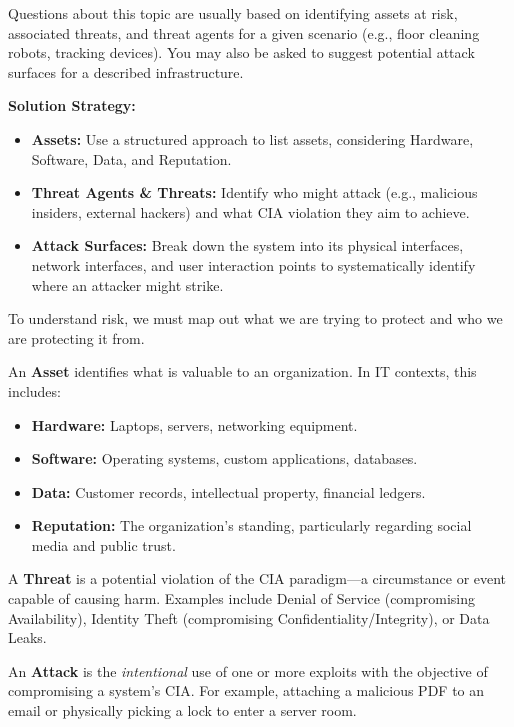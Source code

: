 \begin{tcolorbox}[colback=blue!5!white,colframe=blue!75!black,title=Exam Insight]
Questions about this topic are usually based on identifying assets at risk, associated threats, and threat agents for a given scenario (e.g., floor cleaning robots, tracking devices). You may also be asked to suggest potential attack surfaces for a described infrastructure.

\textbf{Solution Strategy:}
\begin{itemize}
    \item \textbf{Assets:} Use a structured approach to list assets, considering Hardware, Software, Data, and Reputation.
    \item \textbf{Threat Agents \& Threats:} Identify who might attack (e.g., malicious insiders, external hackers) and what CIA violation they aim to achieve.
    \item \textbf{Attack Surfaces:} Break down the system into its physical interfaces, network interfaces, and user interaction points to systematically identify where an attacker might strike.
\end{itemize}
\end{tcolorbox}
To understand risk, we must map out what we are trying to protect and who we are protecting it from.

An \textbf{Asset} identifies what is valuable to an organization. In IT contexts, this includes:
\begin{itemize}
    \item \textbf{Hardware:} Laptops, servers, networking equipment.
    \item \textbf{Software:} Operating systems, custom applications, databases.
    \item \textbf{Data:} Customer records, intellectual property, financial ledgers.
    \item \textbf{Reputation:} The organization's standing, particularly regarding social media and public trust.
\end{itemize}

A \textbf{Threat} is a potential violation of the CIA paradigm---a circumstance or event capable of causing harm. Examples include Denial of Service (compromising Availability), Identity Theft (compromising Confidentiality/Integrity), or Data Leaks.

An \textbf{Attack} is the \textit{intentional} use of one or more exploits with the objective of compromising a system's CIA. For example, attaching a malicious PDF to an email or physically picking a lock to enter a server room.

